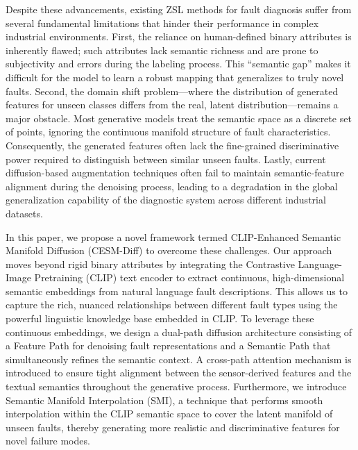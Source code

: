 \documentclass[journal]{IEEEtran}
\begin{document}
Despite these advancements, existing ZSL methods for fault diagnosis suffer from several fundamental limitations that hinder their performance in complex industrial environments. First, the reliance on human-defined binary attributes is inherently flawed; such attributes lack semantic richness and are prone to subjectivity and errors during the labeling process. This ``semantic gap'' makes it difficult for the model to learn a robust mapping that generalizes to truly novel faults. Second, the domain shift problem—where the distribution of generated features for unseen classes differs from the real, latent distribution—remains a major obstacle. Most generative models treat the semantic space as a discrete set of points, ignoring the continuous manifold structure of fault characteristics. Consequently, the generated features often lack the fine-grained discriminative power required to distinguish between similar unseen faults. Lastly, current diffusion-based augmentation techniques often fail to maintain semantic-feature alignment during the denoising process, leading to a degradation in the global generalization capability of the diagnostic system across different industrial datasets.

In this paper, we propose a novel framework termed CLIP-Enhanced Semantic Manifold Diffusion (CESM-Diff) to overcome these challenges. Our approach moves beyond rigid binary attributes by integrating the Contrastive Language-Image Pretraining (CLIP) text encoder to extract continuous, high-dimensional semantic embeddings from natural language fault descriptions. This allows us to capture the rich, nuanced relationships between different fault types using the powerful linguistic knowledge base embedded in CLIP. To leverage these continuous embeddings, we design a dual-path diffusion architecture consisting of a Feature Path for denoising fault representations and a Semantic Path that simultaneously refines the semantic context. A cross-path attention mechanism is introduced to ensure tight alignment between the sensor-derived features and the textual semantics throughout the generative process. Furthermore, we introduce Semantic Manifold Interpolation (SMI), a technique that performs smooth interpolation within the CLIP semantic space to cover the latent manifold of unseen faults, thereby generating more realistic and discriminative features for novel failure modes.
\end{document}
